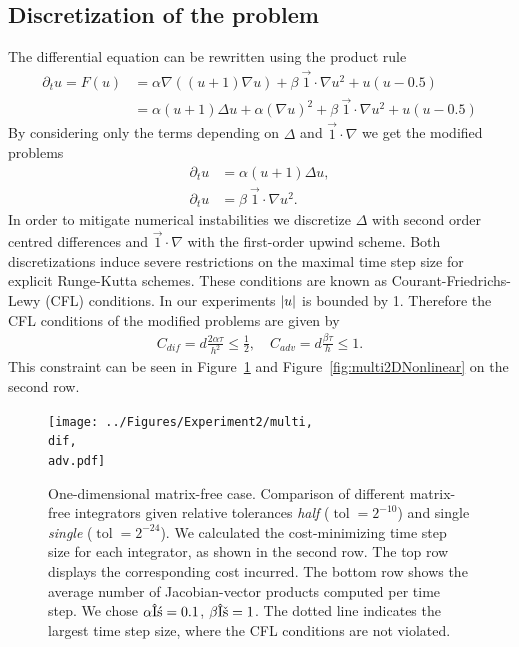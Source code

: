 \documentclass{scrartcl}
\begin{document}
	\subsection{Discretization of the problem}
	The differential equation can be rewritten using the product rule
	\begin{align*}
		\partial_{t}u = F(u) 
			&= \alpha\nabla((u+1)\nabla u) 
				+ \beta\ \vec{1}\!\cdot\!\nabla u^2
				+ u(u-0.5) \\
			&= \alpha(u+1)\Delta u + \alpha(\nabla u)^2 
				+ \beta\ \vec{1}\!\cdot\!\nabla u^2 + u(u-0.5) 				
	\end{align*}
	By considering only the terms depending on $\Delta $ and $\vec{1}\!\cdot\!\nabla $ we get the modified problems
	\begin{align*}
		\partial_{t}u &= \alpha(u+1)\Delta u,
		 \\
		\partial_{t}u &= \beta~\vec{1}\!\cdot\!\nabla u^2 .
	\end{align*}
	In order to mitigate numerical instabilities we discretize $\Delta$ with second order centred differences and $\vec{1}\!\cdot\!\nabla$ with the first-order upwind scheme. Both discretizations induce severe restrictions on the maximal time step size for explicit Runge-Kutta schemes. These conditions are known as Courant-Friedrichs-Lewy (CFL) conditions. In our experiments $\lvert u\rvert$ is bounded by 1. Therefore the CFL conditions of the modified problems are given by
	\begin{align} \label{eq:CFL}
		C_{dif} = d\frac{2\alpha\tau}{h^2} \le \frac{1}{2}, \quad C_{adv} = d\frac{\beta\tau}{h} \le 1.
	\end{align}
	This constraint can be seen in Figure~\ref{fig:multi1DNonlinear} and Figure~\ref{fig:multi2DNonlinear} on the second row. 
	
	\begin{figure}[t]
		\newcommand{\dif}{\detokenize{α}=0.1}
		\newcommand{\adv}{\detokenize{β}=1}
		\centering
		\texttt{[image: ../Figures/Experiment2/multi, \\dif, \\adv.pdf]}
		\caption{One-dimensional matrix-free case. Comparison of different matrix-free integrators given relative tolerances \textit{half} ($\operatorname{tol} = 2^{-10}$) and single \textit{single} ($\operatorname{tol} = 2^{-24}$). We calculated the cost-minimizing time step size for each integrator, as shown in the second row. The top row displays the corresponding cost incurred. The bottom row shows the average number of Jacobian-vector products computed per time step. We chose $\alpha\dif$, $\beta\adv$. The dotted line indicates the largest time step size, where the CFL conditions are not violated.}
		\label{fig:multi1DNonlinear}
	\end{figure}
	
\end{document}
